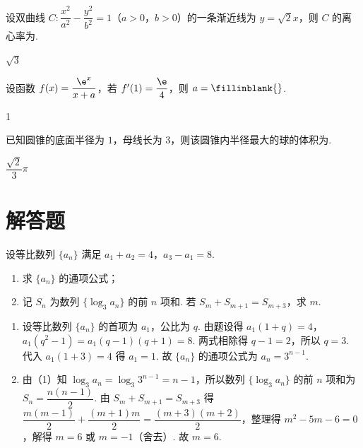 \begin{problem}
设双曲线 \(C:\dfrac{x^2}{a^2}-\dfrac{y^2}{b^2}=1\)（\(a>0\)，\(b>0\)）的一条渐近线为 \(y=\sqrt2x\)，则 \(C\) 的离心率为\fillinblank{}.
\end{problem}

\begin{answer}
\(\sqrt{3}\)
\end{answer}



\begin{problem}
设函数 \(f(x)=\dfrac{\e^x}{x+a}\)，若 \(f'(1)=\dfrac{\e}{4}\)，则 \(a=\fillinblank{}\).
\end{problem}

\begin{answer}
1
\end{answer}



\begin{problem}
已知圆锥的底面半径为 \(1\)，母线长为 \(3\)，则该圆锥内半径最大的球的体积为\fillinblank{}.
\end{problem}

\begin{answer}
\(\dfrac{\sqrt{2}}{3}\pi\)
\end{answer}


\section{解答题}

\begin{problem}
设等比数列 \(\{a_n\}\) 满足 \(a_1+a_2=4\)，\(a_3-a_1=8\).

\begin{enumerate}
    \item 求 \(\{a_n\}\) 的通项公式；
    \item 记 \(S_n\) 为数列 \(\{\log_3 a_n\}\) 的前 \(n\) 项和. 若 \(S_m+S_{m+1}=S_{m+3}\)，求 \(m\).
\end{enumerate}
\end{problem}

\begin{solution}
\begin{enumerate}
    \item 设等比数列 \(\{a_n\}\) 的首项为 \(a_1\)，公比为 \(q\). 由题设得 \(a_1(1+q)=4\)，\(a_1(q^2-1)=a_1(q-1)(q+1)=8\). 两式相除得 \(q-1=2\)，所以 \(q=3\). 代入 \(a_1(1+3)=4\) 得 \(a_1=1\). 故 \(\{a_n\}\) 的通项公式为 \(a_n=3^{n-1}\).
    \item 由（1）知 \(\log_3 a_n=\log_3 3^{n-1}=n-1\)，所以数列 \(\{\log_3 a_n\}\) 的前 \(n\) 项和为 \(S_n=\dfrac{n(n-1)}{2}\). 由 \(S_m+S_{m+1}=S_{m+3}\) 得 \(\dfrac{m(m-1)}{2}+\dfrac{(m+1)m}{2}=\dfrac{(m+3)(m+2)}{2}\)，整理得 \(m^2-5m-6=0\)，解得 \(m=6\) 或 \(m=-1\)（舍去）. 故 \(m=6\).
\end{enumerate}
\end{solution}

